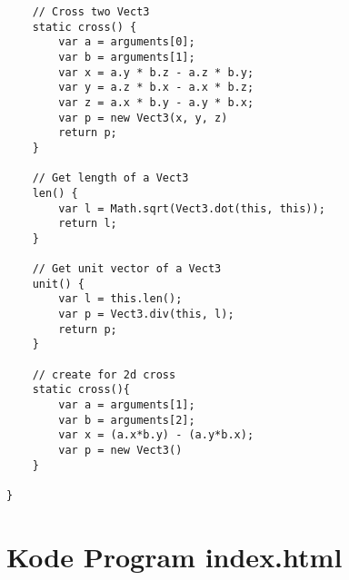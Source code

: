 \begin{lstlisting}
	// Cross two Vect3
	static cross() {
		var a = arguments[0];
		var b = arguments[1];
		var	x = a.y * b.z - a.z * b.y;
		var	y = a.z * b.x - a.x * b.z;
		var	z = a.x * b.y - a.y * b.x;
		var p = new Vect3(x, y, z)
		return p;
	}
	
	// Get length of a Vect3
	len() {
		var l = Math.sqrt(Vect3.dot(this, this));
		return l;
	}
	
	// Get unit vector of a Vect3
	unit() {
		var l = this.len();
		var p = Vect3.div(this, l);
		return p;
	}

	// create for 2d cross
	static cross(){
		var a = arguments[1];
		var b = arguments[2];
		var x = (a.x*b.y) - (a.y*b.x);
		var p = new Vect3() 
	}

}

\end{lstlisting}
\section{Kode Program index.html}
